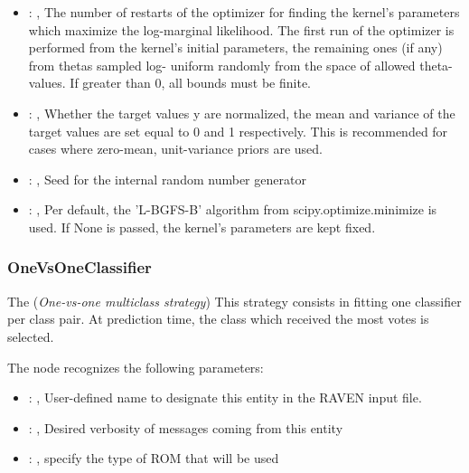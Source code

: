 \begin{itemize}
    \item {}: , 
      The number of restarts of the optimizer for finding the kernel's parameters which maximize the
      log-marginal likelihood. The first run of the optimizer is performed
      from the kernel's initial parameters, the remaining ones (if any) from thetas sampled log-
      uniform randomly from the space of allowed theta-values. If greater than
      0, all bounds must be finite.

    \item {}: , 
      Whether the target values y are normalized, the mean and variance of the target values are set
      equal to 0 and 1 respectively. This is recommended for cases where zero-mean,
      unit-variance priors are used.

    \item {}: , 
      Seed for the internal random number generator

    \item {}: , 
      Per default, the 'L-BGFS-B' algorithm from
      scipy.optimize.minimize is used. If None is passed, the kernel’s
      parameters are kept fixed.
  \end{itemize}


\subsubsection{OneVsOneClassifier}
  The  (\textit{One-vs-one multiclass strategy})
  This strategy consists in fitting one classifier per class pair. At prediction time, the class
  which received the most votes is selected.

  The  node recognizes the following parameters:
    \begin{itemize}
      \item {}: , 
        User-defined name to designate this entity in the RAVEN input file.
      \item {}: , 
        Desired verbosity of messages coming from this entity
      \item {}: , 
        specify the type of ROM that will be used
  \end{itemize}

